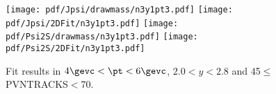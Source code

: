 \begin{figure}[H]
\begin{center}
\texttt{[image: pdf/Jpsi/drawmass/n3y1pt3.pdf]}
\texttt{[image: pdf/Jpsi/2DFit/n3y1pt3.pdf]}
\vspace*{-0.5cm}
\texttt{[image: pdf/Psi2S/drawmass/n3y1pt3.pdf]}
\texttt{[image: pdf/Psi2S/2DFit/n3y1pt3.pdf]}
\vspace*{-0.5cm}
\end{center}
\caption{Fit results in $4\gevc<\pt<6\gevc$, $2.0<y<2.8$ and 45$\leq$PVNTRACKS$<$70.}
\label{Fitn3y1pt3}
\end{figure}
